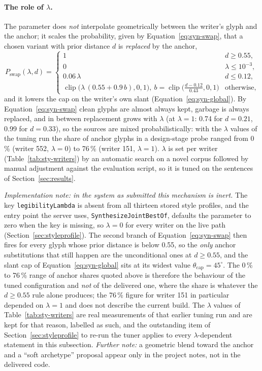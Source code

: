 \paragraph{The role of $\lambda$.}
The parameter does \emph{not} interpolate geometrically between the writer's glyph and the anchor; it scales the probability, given by Equation~\ref{eq:syn-swap}, that a chosen variant with prior distance $d$ is \emph{replaced} by the anchor,
\begin{equation}
P_{\mathrm{swap}}(\lambda,d)=\begin{cases}1&d\ge0.55,\\0&\lambda\le10^{-3},\\0.06\,\lambda&d\le0.12,\\\operatorname{clip}\bigl(\lambda\,(0.55+0.9\,b),0,1\bigr),\ b=\operatorname{clip}\bigl(\tfrac{d-0.12}{0.43},0,1\bigr)&\text{otherwise,}\end{cases}
\label{eq:syn-swap}
\end{equation}
and it lowers the cap on the writer's own slant (Equation~\ref{eq:syn-global}).
By Equation~\ref{eq:syn-swap} clean glyphs are almost always kept, garbage is always replaced, and in between replacement grows with $\lambda$ (at $\lambda=1$: 0.74 for $d=0.21$, 0.99 for $d=0.33$), so the sources are mixed probabilistically: with the $\lambda$ values of the tuning run the share of anchor glyphs in a design-stage probe ranged from 0\,\% (writer 552, $\lambda=0$) to 76\,\% (writer 151, $\lambda=1$).
$\lambda$ is set per writer (Table~\ref{tab:sty-writers}) by an automatic search on a novel corpus followed by manual adjustment against the evaluation script, so it is tuned on the sentences of Section~\ref{sec:results}.

\emph{Implementation note: in the system as submitted this mechanism is inert.}
The key \texttt{legibilityLambda} is absent from all thirteen stored style profiles, and the entry point the server uses, \texttt{SynthesizeJointBestOf}, defaults the parameter to zero when the key is missing, so $\lambda=0$ for every writer on the live path (Section~\ref{sec:styleprofile}).
The second branch of Equation~\ref{eq:syn-swap} then fires for every glyph whose prior distance is below 0.55, so the \emph{only} anchor substitutions that still happen are the unconditional ones at $d\ge0.55$, and the slant cap of Equation~\ref{eq:syn-global} sits at its widest value $\theta_{\mathrm{cap}}=45^\circ$.
The 0\,\% to 76\,\% range of anchor shares quoted above is therefore the behaviour of the tuned configuration and \emph{not} of the delivered one, where the share is whatever the $d\ge0.55$ rule alone produces; the 76\,\% figure for writer 151 in particular depended on $\lambda=1$ and does not describe the current build.
The $\lambda$ values of Table~\ref{tab:sty-writers} are real measurements of that earlier tuning run and are kept for that reason, labelled as such, and the outstanding item of Section~\ref{sec:styleprofile} to re-run the tuner applies to every $\lambda$-dependent statement in this subsection.
\emph{Further note:} a geometric blend toward the anchor and a ``soft archetype'' proposal appear only in the project notes, not in the delivered code.

